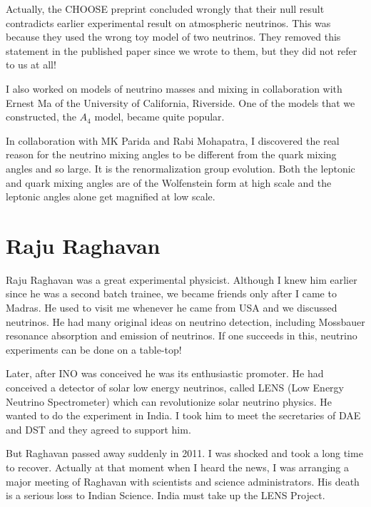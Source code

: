 Actually, the CHOOSE preprint concluded wrongly that their null
result contradicts earlier experimental result on atmospheric
neutrinos. This was because they used the wrong toy model of
two neutrinos. They removed this statement in the published paper
since we wrote to them, but they did not refer to us at all!

I also worked on models of neutrino masses and mixing in collaboration 
with Ernest Ma of the University of California, Ri\-verside. One of the 
models that we constructed, the $A_4$ model, became quite popular.

In collaboration with MK Parida and Rabi Mohapatra, I discovered the 
real reason for the neutrino mixing angles to be diffe\-rent from the 
quark mixing angles and so large. It is the renormalization group 
evolution. Both the leptonic and quark mixing angles are of the 
Wolfenstein form at high scale and the leptonic angles alone get 
magnified at low scale.

\vspace{-.5cm}

\section*{Raju Raghavan}

\vspace{-.2cm}

Raju Raghavan was a great experimental physicist. Although I knew him 
earlier since he was a second batch trainee, we became friends only 
after I came to Madras. He used to visit me whenever he came from USA 
and we discussed neutrinos. He had many origi\-nal ideas on neutrino 
detection, including Mossbauer resonance absorption and emission of 
neutrinos. If one succeeds in this, neutrino experiments can be done on 
a table-top!
 
Later, after INO was conceived he was its enthusiastic promo\-ter. He had 
conceived a detector of solar low energy neutrinos, called LENS (Low 
Energy Neutrino Spectrometer) which can revo\-lutionize solar neutrino 
physics. He wanted to do the expe\-riment in India. I took him to meet the 
secretaries of DAE and DST and they agreed to support him.

But Raghavan passed away suddenly in 2011. I was shocked and took a long 
time to recover. Actually at that moment when I heard the news, I was 
arranging a major meeting of Raghavan with scientists and science 
administrators. His death is a serious loss to Indian Science. India 
must take up the LENS Project.

